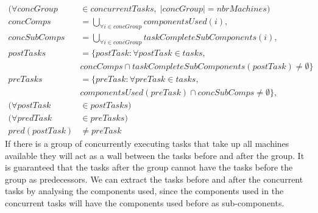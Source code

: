   \begin{equation}
  \begin{aligned}\label{eq:91}
  (\forall concGroup &\in concurrentTasks, \; |concGroup| = nbrMachines) \\
  concComps &= \bigcup_{\forall i \in concGroup}componentsUsed(i), \\
  concSubComps &= \bigcup_{\forall i \in concGroup}taskCompleteSubComponents(i), \\
  postTasks &= \{postTask : \forall postTask \in tasks,\\
  &concComps \cap taskCompleteSubComponents(postTask) \neq \emptyset\}\\
  preTasks &= \{preTask : \forall preTask \in tasks,\\
  &componentsUsed(preTask) \cap concSubComps \neq \emptyset\}, \\
  (\forall postTask &\in postTasks) \\
  (\forall predTask &\in preTasks) \\
  pred(postTask) &\neq preTask
  \end{aligned}
  \end{equation}
  If there is a group of concurrently executing tasks that take up all machines available they will act as a wall between the tasks before and after the group. It is guaranteed that the tasks after the group cannot have the tasks before the group as predecessors. We can extract the tasks before and after the concurrent tasks by analysing the components used, since the components used in the concurrent tasks will have the components used before as sub-components.
 